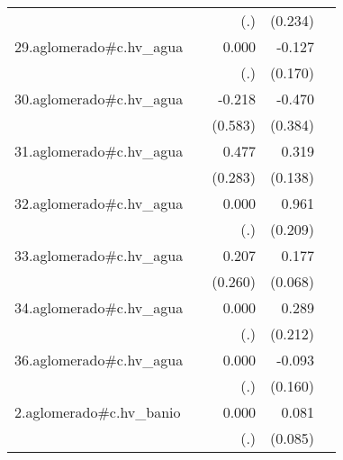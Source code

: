 {\begin{longtable}{l*{4}{D{.}{.}{-1}}}
            &                     &         (.)         &     (0.234)         &                     \\
\addlinespace
29.aglomerado#c.hv\_agua&                     &       0.000         &      -0.127         &                     \\
            &                     &         (.)         &     (0.170)         &                     \\
\addlinespace
30.aglomerado#c.hv\_agua&                     &      -0.218         &      -0.470         &                     \\
            &                     &     (0.583)         &     (0.384)         &                     \\
\addlinespace
31.aglomerado#c.hv\_agua&                     &       0.477         &       0.319\sym{*}  &                     \\
            &                     &     (0.283)         &     (0.138)         &                     \\
\addlinespace
32.aglomerado#c.hv\_agua&                     &       0.000         &       0.961\sym{***}&                     \\
            &                     &         (.)         &     (0.209)         &                     \\
\addlinespace
33.aglomerado#c.hv\_agua&                     &       0.207         &       0.177\sym{**} &                     \\
            &                     &     (0.260)         &     (0.068)         &                     \\
\addlinespace
34.aglomerado#c.hv\_agua&                     &       0.000         &       0.289         &                     \\
            &                     &         (.)         &     (0.212)         &                     \\
\addlinespace
36.aglomerado#c.hv\_agua&                     &       0.000         &      -0.093         &                     \\
            &                     &         (.)         &     (0.160)         &                     \\
\addlinespace
2.aglomerado#c.hv\_banio&                     &       0.000         &       0.081         &                     \\
            &                     &         (.)         &     (0.085)         &                     \\

\end{longtable}}
